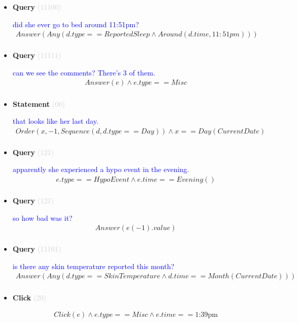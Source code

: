 \documentclass[11pt]{article}
\newcommand{\key}[1]{\textcolor{lightgray}{#1}}
\newcounter{CQuery}
\newcounter{CStatement}
\newcounter{CClick}
\begin{document}
\begin{itemize}
\item
\textbf{Query\theCQuery} \key{(11100)} \addtocounter{CQuery}{1}
\textcolor{blue}{ did she ever go to bed around 11:51pm? }
\begin{multline*}
Answer(Any(d.type==ReportedSleep \wedge Around(d.time, 11:51pm))) \\ 
\end{multline*}


\item
\textbf{Query\theCQuery} \key{(11111)} \addtocounter{CQuery}{1}
\textcolor{blue}{ can we see the comments? There's 3 of them. }
\begin{multline*}
Answer(e) \wedge e.type==Misc \\ 
\end{multline*}


\item
\textbf{Statement\theCStatement} \key{(00)} \addtocounter{CStatement}{1}
\textcolor{blue}{ that looks like her last day. }
\begin{multline*}
Order(x, -1, Sequence(d, d.type==Day)) \wedge x==Day(CurrentDate) \\ 
\end{multline*}


\item
\textbf{Query\theCQuery} \key{(121)} \addtocounter{CQuery}{1}
\textcolor{blue}{ apparently she experienced a hypo event in the evening. }
\begin{multline*}
e.type==HypoEvent \wedge e.time==Evening() \\ 
\end{multline*}


\item
\textbf{Query\theCQuery} \key{(121)} \addtocounter{CQuery}{1}
\textcolor{blue}{ so how bad was it? }
\begin{multline*}
Answer(e(-1).value) \\ 
\end{multline*}


\item
\textbf{Query\theCQuery} \key{(11101)} \addtocounter{CQuery}{1}
\textcolor{blue}{ is there any skin temperature reported this month? }
\begin{multline*}
Answer(Any(d.type==SkinTemperature \wedge d.time==Month(CurrentDate))) \\ 
\end{multline*}


\item
\textbf{Click\theCClick} \key{(20)} \addtocounter{CClick}{1}
\textcolor{blue}{  }
\begin{multline*}
Click(e) \wedge e.type==Misc \wedge e.time==\mbox{1:39pm} \\ 
\end{multline*}



\end{itemize}
\end{document}
